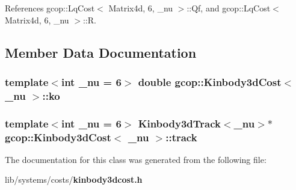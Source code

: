 \-References gcop\-::\-Lq\-Cost$<$ Matrix4d, 6, \-\_\-nu $>$\-::\-Qf, and gcop\-::\-Lq\-Cost$<$ Matrix4d, 6, \-\_\-nu $>$\-::\-R.



\subsection{\-Member \-Data \-Documentation}
\subsubsection[{ko}]{\setlength{\rightskip}{0pt plus 5cm}template$<$int \-\_\-nu = 6$>$ double {\bf gcop\-::\-Kinbody3d\-Cost}$<$ \-\_\-nu $>$\-::{\bf ko}}\label{classgcop_1_1Kinbody3dCost_a59f7e208ae0e03ac8e2937332a5a05b4}
\subsubsection[{track}]{\setlength{\rightskip}{0pt plus 5cm}template$<$int \-\_\-nu = 6$>$ {\bf \-Kinbody3d\-Track}$<$\-\_\-nu$>$$\ast$ {\bf gcop\-::\-Kinbody3d\-Cost}$<$ \-\_\-nu $>$\-::{\bf track}}\label{classgcop_1_1Kinbody3dCost_ae2d4b2225470bb11d21486de07df87f6}


\-The documentation for this class was generated from the following file\-:\begin{DoxyCompactItemize}
\item 
lib/systems/costs/{\bf kinbody3dcost.\-h}\end{DoxyCompactItemize}
